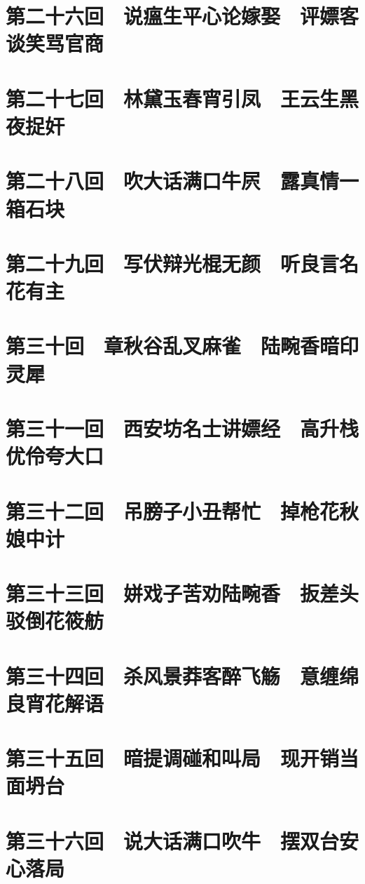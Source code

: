 \documentclass[12pt,UTF8]{ctexbook}
\begin{document}
\chapter{第二十六回　说瘟生平心论嫁娶　评嫖客谈笑骂官商}

\chapter{第二十七回　林黛玉春宵引凤　王云生黑夜捉奸}

\chapter{第二十八回　吹大话满口牛屄　露真情一箱石块}

\chapter{第二十九回　写伏辩光棍无颜　听良言名花有主}

\chapter{第三十回　章秋谷乱叉麻雀　陆畹香暗印灵犀}

\chapter{第三十一回　西安坊名士讲嫖经　高升栈优伶夸大口}

\chapter{第三十二回　吊膀子小丑帮忙　掉枪花秋娘中计}

\chapter{第三十三回　姘戏子苦劝陆畹香　扳差头驳倒花筱舫}

\chapter{第三十四回　杀风景莽客醉飞觞　意缠绵良宵花解语}

\chapter{第三十五回　暗提调碰和叫局　现开销当面坍台}

\chapter{第三十六回　说大话满口吹牛　摆双台安心落局}
\end{document}
